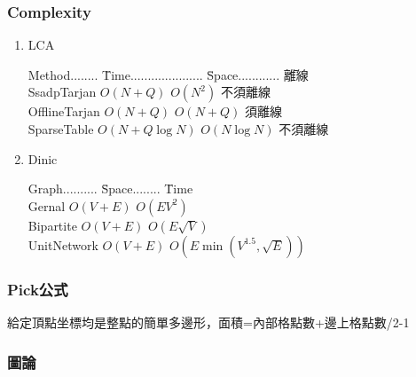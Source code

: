 %

\subsubsection{Complexity}

\begin{enumerate}\itemsep = -5pt

\item LCA
\begin{tabbing}
Method........ \= Time..................... \= Space............ \=  離線\\
SsadpTarjan  \> $O(N + Q)$          \> $O(N ^ 2)$      \>  不須離線\\
OfflineTarjan \> $O(N + Q)$           \> $O(N + Q)$    \>  須離線  \\
SparseTable \> $O(N + Q \log N)$ \> $O(N \log N)$ \>不須離線
\end{tabbing}

\item Dinic
\begin{tabbing}
Graph.......... \= Space........ \= Time\\
Gernal          \> $O(V+E)$ \> $O(EV^2)$  \\
Bipartite        \> $O(V+E)$ \> $O(E\sqrt V)$ \\
UnitNetwork  \> $O(V+E)$ \> $O(E \min(V^{1.5}, \sqrt E))$
\end{tabbing}

\end{enumerate}


\subsubsection{Pick公式}
給定頂點坐標均是整點的簡單多邊形，面積=內部格點數+邊上格點數/2-1

\subsubsection{圖論}

